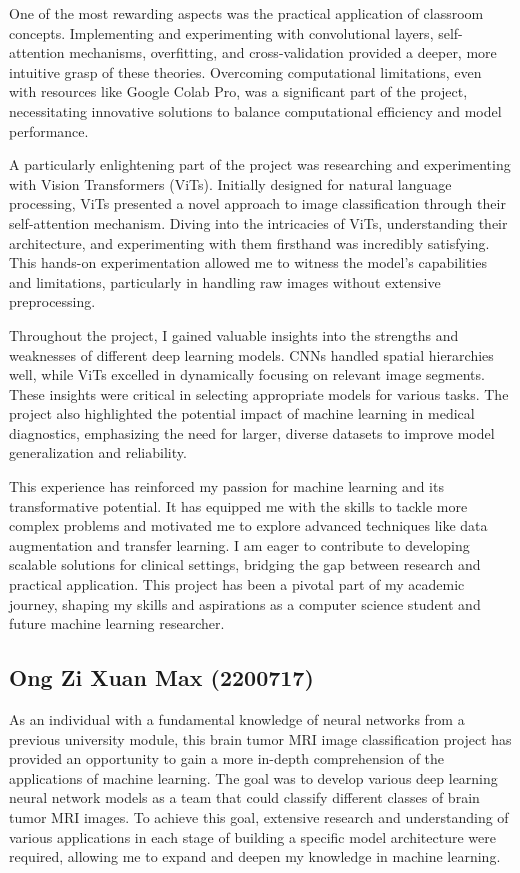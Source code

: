 One of the most rewarding aspects was the practical application of classroom concepts. Implementing and experimenting with convolutional layers, self-attention mechanisms, overfitting, and cross-validation provided a deeper, more intuitive grasp of these theories. Overcoming computational limitations, even with resources like Google Colab Pro, was a significant part of the project, necessitating innovative solutions to balance computational efficiency and model performance.

A particularly enlightening part of the project was researching and experimenting with Vision Transformers (ViTs). Initially designed for natural language processing, ViTs presented a novel approach to image classification through their self-attention mechanism. Diving into the intricacies of ViTs, understanding their architecture, and experimenting with them firsthand was incredibly satisfying. This hands-on experimentation allowed me to witness the model's capabilities and limitations, particularly in handling raw images without extensive preprocessing.

Throughout the project, I gained valuable insights into the strengths and weaknesses of different deep learning models. CNNs handled spatial hierarchies well, while ViTs excelled in dynamically focusing on relevant image segments. These insights were critical in selecting appropriate models for various tasks. The project also highlighted the potential impact of machine learning in medical diagnostics, emphasizing the need for larger, diverse datasets to improve model generalization and reliability.

This experience has reinforced my passion for machine learning and its transformative potential. It has equipped me with the skills to tackle more complex problems and motivated me to explore advanced techniques like data augmentation and transfer learning. I am eager to contribute to developing scalable solutions for clinical settings, bridging the gap between research and practical application. This project has been a pivotal part of my academic journey, shaping my skills and aspirations as a computer science student and future machine learning researcher.


\subsection{Ong Zi Xuan Max (2200717)}

As an individual with a fundamental knowledge of neural networks from a previous university module, this brain tumor MRI image classification project has provided an opportunity to gain a more in-depth comprehension of the applications of machine learning. The goal was to develop various deep learning neural network models as a team that could classify different classes of brain tumor MRI images. To achieve this goal, extensive research and understanding of various applications in each stage of building a specific model architecture were required, allowing me to expand and deepen my knowledge in machine learning.

